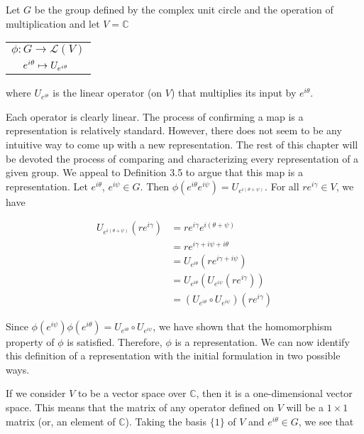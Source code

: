 \begin{example}\end{example}
	Let $G$ be the group defined by the complex unit circle and the operation of multiplication and let $V = \mathbb{C}$ 
	\begin{center}
		 \begin{tabular}{l}$\phi:G\rightarrow \mathcal{L}(V)$\\
				$\hspace{4mm}e^{i\theta}\mapsto U_{e^{i\theta}}$
		\end{tabular}
	\end{center}
	where $U_{e^{i\theta}}$ is the linear operator (on $V$) that multiplies its input by $e^{i\theta}$. 


Each operator is clearly linear. The process of confirming a map is a representation is relatively standard. However, there does not seem to be any intuitive way to come up with a new representation. The rest of this chapter will be devoted the process of comparing and characterizing every representation of a given group. We appeal to Definition 3.5 to argue that this map is a representation. Let $e^{i\theta}$, $e^{i\psi} \in G$. Then $\phi(e^{i\theta} e^{i\psi}) = U_{e^{i(\theta+\psi)}}$. For all $re^{i\gamma} \in V$, we have

	\begin{equation}
		\begin{aligned}
			U_{e^{i(\theta+\psi)}}(re^{i\gamma}) &= re^{i\gamma}  e^{i(\theta+\psi)} \\
										&= re^{i\gamma + i\psi + i\theta} \\
										&= U_{e^{i\theta}}(re^{i\gamma + i\psi}) \\
										&= U_{e^{i\theta}}(U_{e^{i\psi}}(re^{i\gamma})) \\
										&= (U_{e^{i\theta}}\circ U_{e^{i\psi}}) (re^{i\gamma})
		\end{aligned}
	\end{equation}

Since $\phi(e^{i\psi})\phi(e^{i\theta}) = U_{e^{i\theta}}\circ U_{e^{i\psi}}$, we have shown that the homomorphism property of $\phi$ is satisfied. Therefore, $\phi$ is a representation. We can now identify this definition of a representation with the initial formulation in two possible ways.

If we consider $V$ to be a vector space over $\mathbb{C}$, then it is a one-dimensional vector space. This means that the matrix of any operator defined on $V$ will be a $1\times 1$ matrix (or, an element of $\mathbb{C}$). Taking the basis $\{1\}$ of $V$ and $e^{i\theta} \in G$, we see that 

